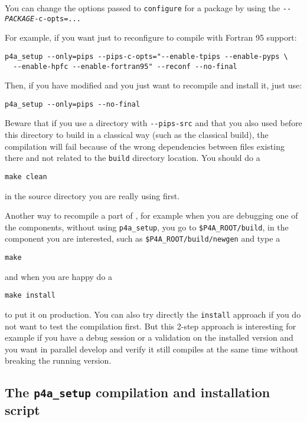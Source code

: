 \documentclass[a4paper]{article}
\begin{document}
You can change the options passed to \texttt{configure} for a package by
using the \texttt{-{}-\emph{PACKAGE}-c-opts=...}

For example, if you want just to reconfigure to compile \Apips with
Fortran 95 support:
\begin{verbatim}
p4a_setup --only=pips --pips-c-opts="--enable-tpips --enable-pyps \
  --enable-hpfc --enable-fortran95" --reconf --no-final
\end{verbatim}

Then, if you have modified \Apips and you just want to recompile and
install it, just use:
\begin{verbatim}
p4a_setup --only=pips --no-final
\end{verbatim}

Beware that if you use a \Apips directory with \verb|--pips-src| and that
you also used before this directory to build \Apips in a classical way
(such as the classical \Asvn build), the compilation will fail because of
the wrong dependencies between files existing there and not related to the
\Apfa \texttt{build} directory location. You should do a
\begin{verbatim}
make clean
\end{verbatim}
in the \Apips source directory you are really using first.

Another way to recompile a part of \Apfa, for example when you are
debugging one of the components, without using \verb|p4a_setup|, you go to
\verb|$P4A_ROOT/build|, in the component you are interested, such as
\verb|$P4A_ROOT/build/newgen| and type a
\begin{verbatim}
make
\end{verbatim}
and when you are happy do a
\begin{verbatim}
make install
\end{verbatim}
to put it on production. You can also try directly the \texttt{install}
approach if you do not want to test the compilation first. But this 2-step
approach is interesting for example if you have a debug session or a
validation on the installed version and you want in parallel develop and
verify it still compiles at the same time without breaking the running
version.


\subsection{The \protect\texttt{p4a\_setup} compilation and installation
script}
\label{sec:p4a_s-comp-script}
\end{document}
